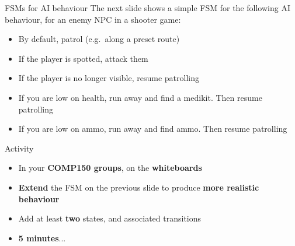 \begin{frame}{FSMs for AI behaviour}
    The next slide shows a simple FSM for the following AI behaviour, for an enemy NPC in a shooter game: \pause
    \begin{itemize}
        \item By default, patrol (e.g.\ along a preset route) \pause
        \item If the player is spotted, attack them \pause
        \item If the player is no longer visible, resume patrolling \pause
        \item If you are low on health, run away and find a medikit. Then resume patrolling \pause
        \item If you are low on ammo, run away and find ammo. Then resume patrolling \pause
    \end{itemize}
\end{frame}

\begin{frame}
    \begin{center}\end{center}
\end{frame}

\begin{frame}{Activity}
    \begin{itemize}
        \item In your \textbf{COMP150 groups}, on the \textbf{whiteboards}
        \item \textbf{Extend} the FSM on the previous slide to produce \textbf{more realistic behaviour}
        \item Add at least \textbf{two} states, and associated transitions
        \item \textbf{5 minutes}...
    \end{itemize}
\end{frame}

